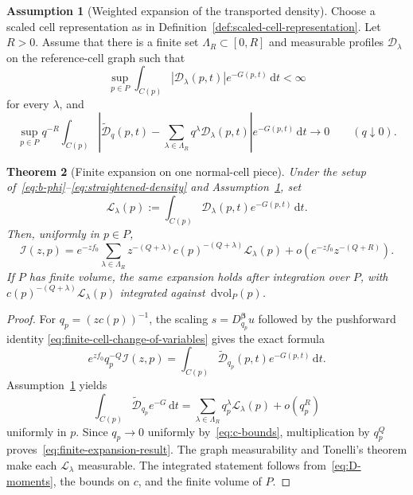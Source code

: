 \documentclass[11pt]{amsart}
\numberwithin{equation}{section}
\newtheorem{theorem}{Theorem}[section]
\theoremstyle{definition}
\newtheorem{assumption}[theorem]{Assumption}
\theoremstyle{remark}
\newcommand{\dd}{\,\mathrm{d}}
\newcommand{\dvol}{\,\mathrm{dvol}}
\newcommand{\cD}{\mathcal{D}}
\newcommand{\cI}{\mathcal{I}}
\newcommand{\cL}{\mathcal{L}}
\begin{document}
\begin{assumption}[Weighted expansion of the transported density]
\label{ass:scaled-expansion}
Choose a scaled cell representation as in
Definition~\ref{def:scaled-cell-representation}.  Let $R>0$.  Assume that there
is a finite set $\Lambda_R\subset[0,R]$ and measurable profiles
$\cD_\lambda$ on the reference-cell graph such that
\begin{equation}\label{eq:D-moments}
 \sup_{p\in P}\int_{C(p)}|\cD_\lambda(p,t)|e^{-G(p,t)}\dd t<\infty
\end{equation}
for every $\lambda$, and
\begin{equation}\label{eq:scaled-L1-expansion}
 \sup_{p\in P}q^{-R}\int_{C(p)}
 \left|\widetilde{\cD}_q(p,t)-
 \sum_{\lambda\in\Lambda_R}q^\lambda \cD_\lambda(p,t)\right|
 e^{-G(p,t)}\dd t\longrightarrow0
 \qquad(q\downarrow0).
\end{equation}
\end{assumption}

\begin{theorem}[Finite expansion on one normal-cell piece]
\label{thm:finite-expansion}
Under the setup of~\eqref{eq:b-phi}--\eqref{eq:straightened-density}
and Assumption~\ref{ass:scaled-expansion}, set
\begin{equation}\label{eq:L-lambda}
 \cL_\lambda(p):=\int_{C(p)}\cD_\lambda(p,t)e^{-G(p,t)}\dd t.
\end{equation}
Then, uniformly in $p\in P$,
\begin{equation}\label{eq:finite-expansion-result}
 \cI(z,p)=e^{-zf_0}
 \sum_{\lambda\in\Lambda_R}
 z^{-(Q+\lambda)}c(p)^{-(Q+\lambda)}\cL_\lambda(p)
 +o\left(e^{-zf_0}z^{-(Q+R)}\right).
\end{equation}
If $P$ has finite volume, the same expansion holds after integration over
$P$, with $c(p)^{-(Q+\lambda)}\cL_\lambda(p)$ integrated against
$\dvol_P(p)$.
\end{theorem}

\begin{proof}
For $q_p=(zc(p))^{-1}$, the scaling
$s=D_{q_p}^{\bm\beta}u$ followed by the pushforward identity
\eqref{eq:finite-cell-change-of-variables} gives the exact formula
\begin{equation}\label{eq:exact-expansion-identity}
 e^{zf_0}q_p^{-Q}\cI(z,p)
 =\int_{C(p)}\widetilde{\cD}_{q_p}(p,t)e^{-G(p,t)}\dd t.
\end{equation}
Assumption~\ref{ass:scaled-expansion} yields
\[
 \int_{C(p)}\widetilde{\cD}_{q_p}e^{-G}\dd t
 =\sum_{\lambda\in\Lambda_R}q_p^\lambda \cL_\lambda(p)
 +o(q_p^R)
\]
uniformly in $p$.  Since $q_p\to0$ uniformly by~\eqref{eq:c-bounds},
multiplication by $q_p^Q$ proves~\eqref{eq:finite-expansion-result}.  The
graph measurability and Tonelli's theorem make each $\cL_\lambda$ measurable.
The integrated statement follows from~\eqref{eq:D-moments}, the bounds on
$c$, and the finite volume of $P$.
\end{proof}
\end{document}

